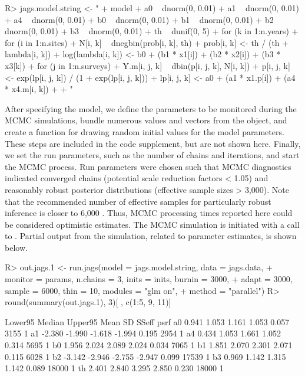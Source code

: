 \documentclass[codesnippet]{jss}
\begin{document}
\begin{CodeInput}
R> jags.model.string <- "
+    model {
+      a0 ~ dnorm(0, 0.01)
+      a1 ~ dnorm(0, 0.01)
+      a4 ~ dnorm(0, 0.01)
+      b0 ~ dnorm(0, 0.01)
+      b1 ~ dnorm(0, 0.01)
+      b2 ~ dnorm(0, 0.01)
+      b3 ~ dnorm(0, 0.01)
+      th ~ dunif(0, 5)
+    for (k in 1:n.years){
+      for (i in 1:n.sites){
+        N[i, k] ~ dnegbin(prob[i, k], th)
+        prob[i, k] <- th / (th + lambda[i, k])
+        log(lambda[i, k]) <- b0 + (b1 * x1[i]) + (b2 * x2[i]) + (b3 * x3[k])
+        for (j in 1:n.surveys){
+          Y.m[i, j, k] ~ dbin(p[i, j, k], N[i, k])
+          p[i, j, k] <- exp(lp[i, j, k]) / (1 + exp(lp[i, j, k]))
+          lp[i, j, k] <- a0 + (a1 * x1.p[i]) + (a4 * x4.m[i, k])
+    }}}}
+  "
\end{CodeInput}

After specifying the  model, we define the parameters to be 
monitored during the MCMC simulations, bundle numerous values and vectors 
from the  object, and create a function for drawing random 
initial values for the model parameters. These steps are included in the 
code supplement, but are not shown here. Finally, we set the run parameters, 
such as the number of chains and iterations, and start the MCMC process. Run 
parameters were chosen such that MCMC diagnostics indicated converged chains 
(potential scale reduction factors < 1.05) and reasonably robust posterior 
distributions (effective sample sizes > 3,000). Note that the recommended 
number of effective samples for particularly robust inference is closer to 
6,000 \citep{Gong_Flegal_2016}. Thus, MCMC processing times reported here 
could be considered optimistic estimates. The MCMC simulation is initiated 
with a call to . Partial output from the simulation, 
related to parameter estimates, is shown below.

\begin{CodeInput}
R> out.jags.1 <- run.jags(model = jags.model.string, data = jags.data, 
+    monitor = params, n.chains = 3, inits = inits, burnin = 3000, 
+    adapt = 3000, sample = 6000, thin = 10, modules = "glm on", 
+    method = "parallel")
R> round(summary(out.jags.1), 3)[ , c(1:5, 9, 11)]
\end{CodeInput}
\begin{CodeOutput}
            Lower95 Median Upper95   Mean    SD SSeff psrf
a0            0.941  1.053   1.161  1.053 0.057  3155    1
a1           -2.380 -1.990  -1.618 -1.994 0.195  2954    1
a4            0.434  1.053   1.661  1.052 0.314  5695    1
b0            1.956  2.024   2.089  2.024 0.034  7065    1
b1            1.851  2.070   2.301  2.071 0.115  6028    1
b2           -3.142 -2.946  -2.755 -2.947 0.099 17539    1
b3            0.969  1.142   1.315  1.142 0.089 18000    1
th            2.401  2.840   3.295  2.850 0.230 18000    1
\end{CodeOutput}
\end{document}
